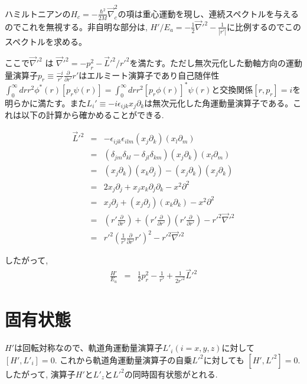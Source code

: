 \documentclass[11pt,a4paper]{jsarticle}
\begin{document}
ハミルトニアンの$H_c = -\frac{\hbar^2}{2M} \vec{\nabla}_c^2$の項は重心運動を現し、連続スペクトルを与えるのでこれを無視する。非自明な部分は, $H'/E_a =- \frac{1}{2} \vec{\nabla}'^2 -\frac{1}{|r'|}$に比例するのでこのスペクトルを求める。

ここで$\vec{\nabla}'^2$ は $\vec{\nabla}'^2= -p_r^2 -\vec{L}'^2/r'^2$を満たす。ただし無次元化した動軸方向の運動量演算子$p_r \equiv\frac{-i}{r'}\frac{\partial}{\partial r'} r'$はエルミート演算子であり自己随伴性$\int _0^\infty dr r^2 \phi^*(r) [ p_r \psi(r) ] = \int _0^\infty dr r^2 [ p_r \phi(r) ]^* \psi(r) $と交換関係$[r,p_r]=i$を明らかに満たす。また$L_i' \equiv -i \epsilon_{ijk} x_j\partial_k$は無次元化した角運動量演算子である。これは以下の計算から確かめることができる.

\begin{eqnarray}
\vec{L}'^2 &=& - \epsilon_{ijk}\epsilon_{ilm} (x_j\partial_k)(x_l\partial_m)\\
&=& (\delta_{jm}\delta_{kl} - \delta_{jl}\delta_{km}) (x_j\partial_k)(x_l\partial_m)\\
&=& (x_j\partial_k)(x_k\partial_j) -(x_j\partial_k)(x_j\partial_k)\\
&=& 2 x_j\partial_j + x_j x_k \partial_j \partial_k  - x^2 \partial^2\\
&=& x_j\partial_j + ( x_j \partial_j)( x_k \partial_k)  - x^2 \partial^2\\
&=& ( r' \frac{\partial}{\partial r'}) + ( r' \frac{\partial}{\partial r'})( r' \frac{\partial}{\partial r'}) - r'^2 \vec{\nabla}'^2\\
&=& r'^2 ( \frac{1}{r'} \frac{\partial}{\partial r'} r' )^2 - r'^2 \vec{\nabla}'^2
\end{eqnarray}

したがって, 
\begin{eqnarray}
\frac{H'}{E_a} &=& \frac{1}{2}p_r^2 - \frac{1}{r'} + \frac{1}{2 r'^2} \vec{L}'^2 
\end{eqnarray}

\section{固有状態}

$H'$は回転対称なので、軌道角運動量演算子$L'_i (i=x,y,z)$に対して$[H', L'_i]=0$. これから軌道角運動量演算子の自乗$L'^2$に対しても $[H', L'^2]=0$. したがって, 演算子$H'$と$L'_z$と$L'^2$の同時固有状態がとれる.  
\end{document}
